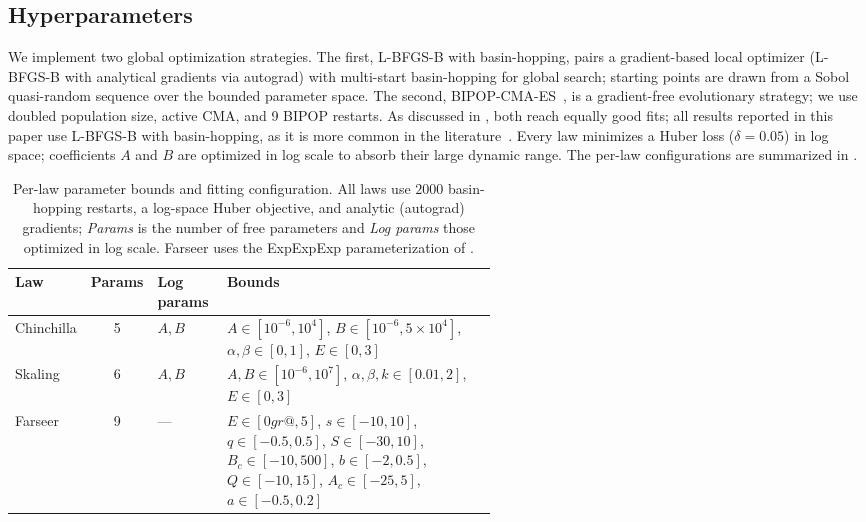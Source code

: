 \documentclass[]{fairmeta}
\newcommand{\ska}{Skaling}
\begin{document}
\subsection{Hyperparameters}

We implement two global optimization strategies. The first, L-BFGS-B with basin-hopping, pairs a gradient-based local optimizer (L-BFGS-B with analytical gradients via autograd) with multi-start basin-hopping for global search; starting points are drawn from a Sobol quasi-random sequence over the bounded parameter space. The second, BIPOP-CMA-ES~\citep{hansen2016cma}, is a gradient-free evolutionary strategy; we use doubled population size, active CMA, and 9 BIPOP restarts. As discussed in , both reach equally good fits; all results reported in this paper use L-BFGS-B with basin-hopping, as it is more common in the literature~\citep{besiroglu2024chinchilla,shukor2026scaling}. Every law minimizes a Huber loss ($\delta=0.05$) in log space; coefficients $A$ and $B$ are optimized in log scale to absorb their large dynamic range. The per-law configurations are summarized in .

\begin{table}[h]
\centering
\footnotesize
\setlength{\tabcolsep}{4pt}
\caption{Per-law parameter bounds and fitting configuration. All laws use $2000$ basin-hopping restarts, a log-space Huber objective, and analytic (autograd) gradients; \emph{Params} is the number of free parameters and \emph{Log params} those optimized in log scale. Farseer uses the ExpExpExp parameterization of \citep{li2025predictable}.}
\label{tab:fit_hparams}
\begin{tabular}{l c l p{0.56\linewidth}}
\toprule
Law & Params & Log params & Bounds \\
\midrule
Chinchilla & 5 & $A,B$ & $A\!\in\![10^{-6},10^{4}]$, $B\!\in\![10^{-6},5{\times}10^{4}]$, $\alpha,\beta\!\in\![0,1]$, $E\!\in\![0,3]$ \\
\ska{}     & 6 & $A,B$ & $A,B\!\in\![10^{-6},10^{7}]$, $\alpha,\beta,k\!\in\![0.01,2]$, $E\!\in\![0,3]$ \\
Farseer    & 9 & ---   & $E\!\in\![0gr@,5]$, $s\!\in\![-10,10]$, $q\!\in\![-0.5,0.5]$, $S\!\in\![-30,10]$, $B_c\!\in\![-10,500]$, $b\!\in\![-2,0.5]$, $Q\!\in\![-10,15]$, $A_c\!\in\![-25,5]$, $a\!\in\![-0.5,0.2]$ \\
\bottomrule
\end{tabular}
\end{table}
\end{document}
